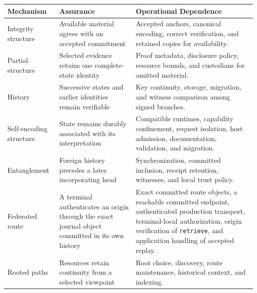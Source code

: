 \begin{tabularx}{\textwidth}{@{}>{\raggedright\arraybackslash}p{}>{\raggedright\arraybackslash}X>{\raggedright\arraybackslash}X@{}}
\toprule
\textbf{Mechanism} & \textbf{Assurance} & \textbf{Operational Dependence} \\
\midrule
Integrity structure & Available material agrees with an accepted commitment & Accepted anchors, canonical encoding, correct verification, and retained copies for availability. \\
Partial structure & Selected evidence retains one complete-state identity & Proof metadata, disclosure policy, resource bounds, and custodians for omitted material. \\
History & Successive states and earlier identities remain verifiable & Key continuity, storage, migration, and witness comparison among signed branches. \\
Self-encoding structure & State remains durably associated with its interpretation & Compatible runtimes, capability confinement, request isolation, host admission, documentation, validation, and migration. \\
Entanglement & Foreign history precedes a later incorporating head & Synchronization, committed inclusion, receipt retention, witnesses, and local trust policy. \\
Federated route & A terminal authenticates an origin through the exact journal object committed in its own history & Exact committed route objects, a reachable committed endpoint, authenticated production transport, terminal-local authorization, origin verification of \texttt{retrieve}, and application handling of accepted replay. \\
Rooted paths & Resources retain continuity from a selected viewpoint & Root choice, discovery, route maintenance, historical context, and indexing. \\
\bottomrule
\end{tabularx}
